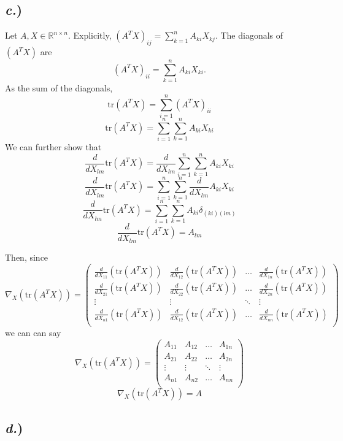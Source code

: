 \documentclass{report}
\begin{document}
\subsection*{\textit{c.})}

Let $A,X \in \mathbb{R}^{n \times n}$. Explicitly, $(A^TX)_{ij} = \sum_{k=1}^n{A_{ki}X_{kj}}$. The diagonals of $(A^TX)$ are
$$ (A^TX)_{ii} = \sum_{k=1}^n{A_{ki}X_{ki}}. $$ 
As the sum of the diagonals,
$$ \text{tr}\left(A^TX\right) = \sum_{i=1}^n{(A^TX)_{ii}} $$
$$ \text{tr}\left(A^TX\right) = \sum_{i=1}^n{\sum_{k=1}^n{A_{ki}X_{ki}}} $$
We can further show that
$$ \frac{d}{dX_{lm}}\text{tr}\left(A^TX\right) = \frac{d}{dX_{lm}}\sum_{i=1}^n{\sum_{k=1}^n{A_{ki}X_{ki}}} $$
$$ \frac{d}{dX_{lm}}\text{tr}\left(A^TX\right) = \sum_{i=1}^n{\sum_{k=1}^n{\frac{d}{dX_{lm}}A_{ki}X_{ki}}} $$
$$ \frac{d}{dX_{lm}}\text{tr}\left(A^TX\right) = \sum_{i=1}^n{\sum_{k=1}^n{A_{ki}\delta_{(ki)(lm)}}} $$
$$ \frac{d}{dX_{lm}}\text{tr}\left(A^TX\right) = A_{lm} $$
	
Then, since
$$ \nabla_X(\text{tr}\left(A^TX\right)) =
\begin{pmatrix}
\frac{d}{dX_{11}}(\text{tr}\left(A^TX\right)) & \frac{d}{dX_{12}}(\text{tr}\left(A^TX\right)) & \ldots & \frac{d}{dX_{1n}}(\text{tr}\left(A^TX\right)) \\
\frac{d}{dX_{21}}(\text{tr}\left(A^TX\right)) & \frac{d}{dX_{22}}(\text{tr}\left(A^TX\right)) & \ldots & \frac{d}{dX_{2n}}(\text{tr}\left(A^TX\right)) \\
\vdots & \vdots & \ddots & \vdots \\
\frac{d}{dX_{n1}}(\text{tr}\left(A^TX\right)) & \frac{d}{dX_{12}}(\text{tr}\left(A^TX\right)) & \ldots & \frac{d}{dX_{nn}}(\text{tr}\left(A^TX\right)) \\
\end{pmatrix}$$
we can can say
$$ \nabla_X(\text{tr}\left(A^TX\right)) =
\begin{pmatrix}
A_{11} & A_{12} & \ldots & A_{1n} \\
A_{21} & A_{22} & \ldots & A_{2n} \\
\vdots & \vdots & \ddots & \vdots \\
A_{n1} & A_{n2} & \ldots & A_{nn} \\
\end{pmatrix}$$
$$\boxed{ \nabla_X(\text{tr}\left(A^TX\right)) = A }$$

\subsection*{\textit{d.})}
\end{document}
